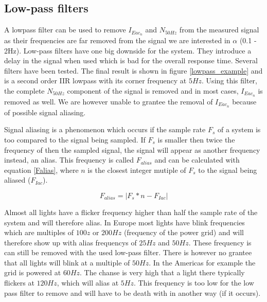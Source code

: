 \subsection{Low-pass filters}
A lowpass filter can be used to remove $I_{Eac{_n}}$ and $N_{50Hz}$ from the measured signal as their frequencies are far removed from the signal we are interested in $\alpha$ (0.1 - 2Hz). Low-pass filters have one big downside for the system. They introduce a delay in the signal when used which is bad for the overall response time. Several filters have been tested. The final result is shown in figure \ref{lowpass_example} and is a second order IIR lowpass with its corner frequency at $5Hz$. Using this filter, the complete $N_{50Hz}$ component of the signal is removed and in most cases, $I_{Eac{_n}}$ is removed as well. We are however unable to grantee the removal of $I_{Eac{_n}}$ because of possible signal aliasing.

Signal aliasing is a phenomenon which occurs if the sample rate $F_{s}$ of a system is too compared to the signal being sampled. If $F_{s}$ is smaller then twice the frequency of then the sampled signal, the signal will appear as another frequency instead, an alias. This frequency is called $F_{alias}$ and can be calculated with equation \ref{Falias}, where $n$ is the closest integer mutiple of $F_{s}$ to the signal being aliased ($F_{Iac}$).

\begin{equation}
\label{Falias}
	F_{alias} = |F_{s} * n - F_{Iac}|
\end{equation}

Almost all lights have a flicker frequency higher than half the sample rate of the system and will therefore alias. In Europe most lights have blink frequencies which are multiples of $100z$ or $200Hz$ (frequency of the power grid) and will therefore show up with alias frequencys of $25Hz$ and $50Hz$. These frequency is can still be removed with the used low-pass filter. There is however no grantee that all lights will blink at a multiple of $50Hz$. In the Americas for example the grid is powered at $60Hz$. The chanse is very high that a light there typically flickers at $120Hz$, which will alias at $5Hz$. This frequency is too low for the low pass filter to remove and will have to be death with in another way (if it occurs).

